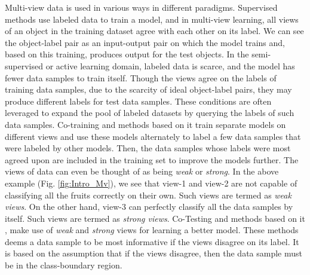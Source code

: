 Multi-view data is used in various ways in different paradigms. Supervised methods use labeled data to train a model, and in multi-view learning, all views of an object in the training dataset agree with each other on its label. We can see the object-label pair as an input-output pair on which the model trains and, based on this training, produces output for the test objects. In the semi-supervised or active learning domain, labeled data is scarce, and the model has fewer data samples to train itself. Though the views agree on the labels of training data samples, due to the scarcity of ideal object-label pairs, they may produce different labels for test data samples. These conditions are often leveraged to expand the pool of labeled datasets by querying the labels of such data samples. Co-training\cite{BlumM98} and methods based on it \cite{NigamG00, SunJ11} train separate models on different views and use these models alternately to label a few data samples that were labeled by other models. Then, the data samples whose labels were most agreed upon are included in the training set to improve the models further. The views of data can even be thought of as being \textit{weak} or \textit{strong}. In the above example (Fig. \ref{fig:Intro_Mv}), we see that view-1 and view-2 are not capable of classifying all the fruits correctly on their own. Such views are termed as \textit{weak views}. On the other hand, view-3 can perfectly classify all the data samples by itself. Such views are termed as \textit{strong views}. Co-Testing \cite{MusleaMK00} and methods based on it \cite{MusleaMK03}, make use of \textit{weak} and \textit{strong} views for learning a better model. These methods deems a data sample to be most informative if the views disagree on its label. It is based on the assumption that if the views disagree, then the data sample must be in the class-boundary region.%


